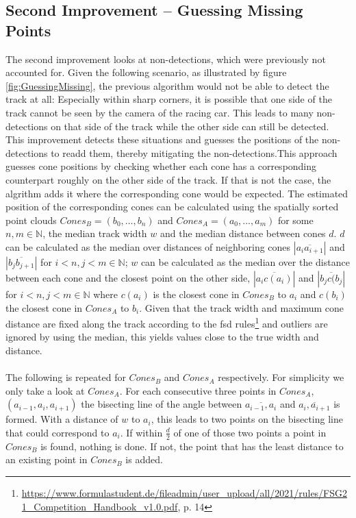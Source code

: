 \subsection{Second Improvement – Guessing Missing Points}
The second improvement looks at non-detections, which were previously not accounted for. Given the following scenario, as illustrated by figure \ref{fig:GuessingMissing}, the previous algorithm would not be able to detect the track at all: Especially within sharp corners, it is possible that one side of the track cannot be seen by the camera of the racing car. This leads to many non-detections on that side of the track while the other side can still be detected. This improvement detects these situations and guesses the positions of the non-detections to readd them, thereby mitigating the non-detections.This approach guesses cone positions by checking whether each cone has a corresponding counterpart roughly on the other side of the track. If that is not the case, the algrithm adds it where the corresponding cone would be expected. The estimated position of the corresponding cones can be calculated using the spatially sorted point clouds $Cones_B = (b_0,...,b_n)$ and $Cones_A = (a_0,...,a_m)$ for some $n,m \in \mathbb{N}$, the median track width $w$ and the median distance between cones $d$. $d$ can be calculated as the median over distances of neighboring cones $|\overline{a_i a_{i+1}}|$ and $|\overline{b_j b_{j+1}}|$ for $i<n,j<m \in \mathbb{N}$; $w$ can be calculated as the median over the distance between each cone and the closest point on the other side, $|\overline{a_i c(a_{i})}|$ and $|\overline{b_j c(b_{j}}|$ for $i<n,j<m \in \mathbb{N}$ where $c(a_i)$ is the closest cone in $Cones_B$ to $a_i$ and $c(b_i)$ the closest cone in $Cones_A$ to $b_i$. Given that the track width and maximum cone distance are fixed along the track according to the \ac{fsd} rules\footnote{\url{https://www.formulastudent.de/fileadmin/user_upload/all/2021/rules/FSG21_Competition_Handbook_v1.0.pdf}, p. 14} and outliers are ignored by using the median, this yields values close to the true width and distance.\\
\\The following is repeated for $Cones_B$ and $Cones_A$ respectively. For simplicity we only take a look at $Cones_A$. For each consecutive three points in $Cones_A$, $(a_{i-1},a_{i},a_{i+1})$ the bisecting line of the angle between $\overline{a_{i-1},a_{i}}$ and $\overline{a_{i},a_{i+1}}$ is formed. With a distance of $w$ to $a_{i}$, this leads to two points on the bisecting line that could correspond to  $a_{i}$. If within $\frac{d}{2}$ of one of those two points a point in $Cones_B$ is found, nothing is done. If not,  the point that has the least distance to an existing point in $Cones_B$ is added. \\
